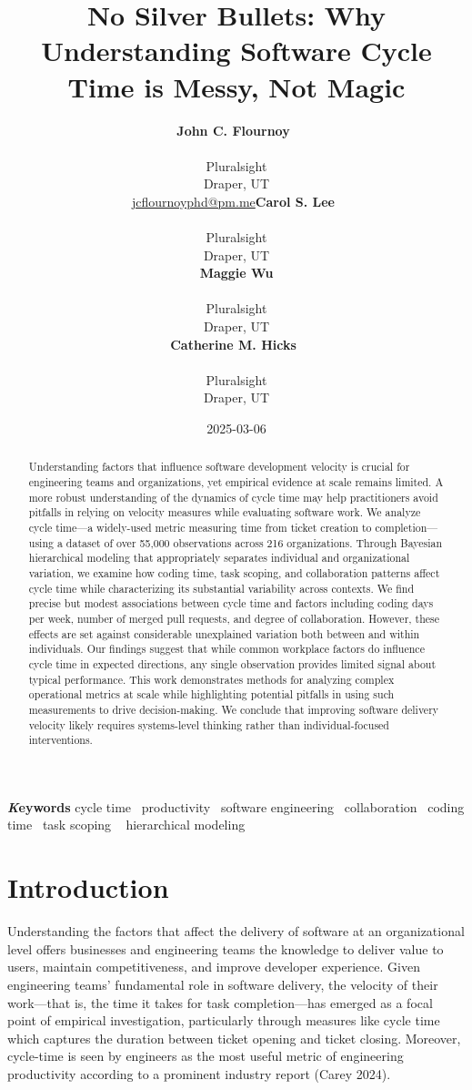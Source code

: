 \documentclass[
]{article}
\title{No Silver Bullets: Why Understanding Software Cycle Time is
Messy, Not Magic}
\author{\textbf{John C.
Flournoy}~\orcidlink{0000-0003-1735-1221}\\\\Pluralsight\\Draper,
UT\\\href{mailto:jcflournoyphd@pm.me}{jcflournoyphd@pm.me}\asep\textbf{Carol
S. Lee}~\orcidlink{0000-0002-6909-6157}\\\\Pluralsight\\Draper,
UT\\\asep\textbf{Maggie Wu}\\\\Pluralsight\\Draper,
UT\\\asep\textbf{Catherine M.
Hicks}~\orcidlink{0009-0007-5657-1661}\\\\Pluralsight\\Draper, UT\\}
\date{2025-03-06}
\begin{document}
\maketitle
\begin{abstract}
Understanding factors that influence software development velocity is
crucial for engineering teams and organizations, yet empirical evidence
at scale remains limited. A more robust understanding of the dynamics of
cycle time may help practitioners avoid pitfalls in relying on velocity
measures while evaluating software work. We analyze cycle time---a
widely-used metric measuring time from ticket creation to
completion---using a dataset of over 55,000 observations across 216
organizations. Through Bayesian hierarchical modeling that appropriately
separates individual and organizational variation, we examine how coding
time, task scoping, and collaboration patterns affect cycle time while
characterizing its substantial variability across contexts. We find
precise but modest associations between cycle time and factors including
coding days per week, number of merged pull requests, and degree of
collaboration. However, these effects are set against considerable
unexplained variation both between and within individuals. Our findings
suggest that while common workplace factors do influence cycle time in
expected directions, any single observation provides limited signal
about typical performance. This work demonstrates methods for analyzing
complex operational metrics at scale while highlighting potential
pitfalls in using such measurements to drive decision-making. We
conclude that improving software delivery velocity likely requires
systems-level thinking rather than individual-focused interventions.
\end{abstract}
{\bfseries \emph Keywords}
\def\sep{\textbullet\ }
cycle time \sep productivity \sep software
engineering \sep collaboration \sep coding time \sep task scoping \sep 
hierarchical modeling



\section{Introduction}\label{introduction}

Understanding the factors that affect the delivery of software at an
organizational level offers businesses and engineering teams the
knowledge to deliver value to users, maintain competitiveness, and
improve developer experience. Given engineering teams' fundamental role
in software delivery, the velocity of their work---that is, the time it
takes for task completion---has emerged as a focal point of empirical
investigation, particularly through measures like cycle time which
captures the duration between ticket opening and ticket closing.
Moreover, cycle-time is seen by engineers as the most useful metric of
engineering productivity according to a prominent industry report (Carey
2024).
\end{document}
